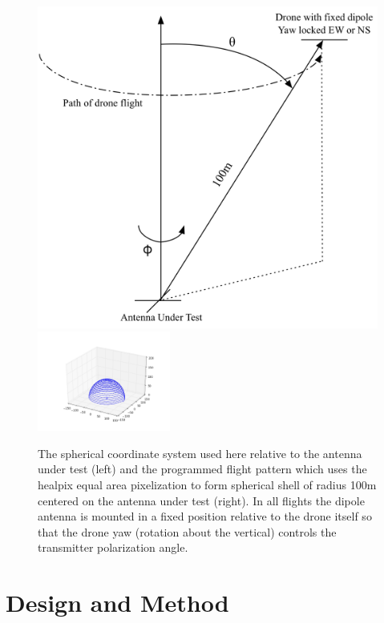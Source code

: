 \documentclass[preprint2,numberedappendix,tighten,twocolappendix]{aastex6}
\begin{document}
\begin{figure}[htb]
\begin{center}
\includegraphics[width=0.6\columnwidth]{figures/ECHO_flight_diagram.png}
\includegraphics[width=0.39\textwidth]{figures/ECHO_flight_path.png}
\caption{The spherical coordinate system used here relative to the antenna under test (left) and the programmed flight pattern which uses the healpix equal area pixelization to form spherical shell of radius 100m centered on the antenna under test (right). In all flights the dipole antenna is mounted in a fixed position relative to the drone itself so that the drone yaw (rotation about the vertical) controls the transmitter polarization angle. }
\end{center}
\end{figure}

\section{Design and Method}
\label{sec:design}
\end{document}
